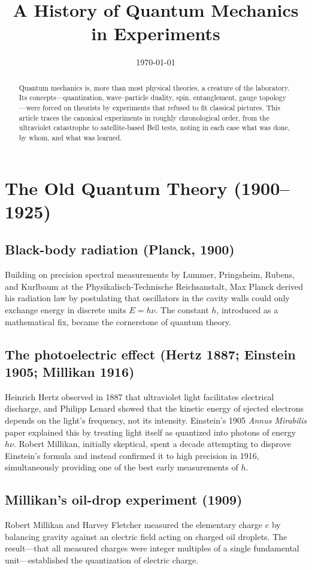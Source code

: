 \documentclass[11pt]{article}
\title{A History of Quantum Mechanics in Experiments}
\author{}
\date{\today}
\begin{document}
\maketitle

\begin{abstract}
Quantum mechanics is, more than most physical theories, a creature of the laboratory. Its concepts---quantization, wave--particle duality, spin, entanglement, gauge topology---were forced on theorists by experiments that refused to fit classical pictures. This article traces the canonical experiments in roughly chronological order, from the ultraviolet catastrophe to satellite-based Bell tests, noting in each case what was done, by whom, and what was learned.
\end{abstract}

\section{The Old Quantum Theory (1900--1925)}

\subsection{Black-body radiation (Planck, 1900)}
Building on precision spectral measurements by Lummer, Pringsheim, Rubens, and Kurlbaum at the Physikalisch-Technische Reichsanstalt, Max Planck derived his radiation law by postulating that oscillators in the cavity walls could only exchange energy in discrete units $E = h\nu$. The constant $h$, introduced as a mathematical fix, became the cornerstone of quantum theory.

\subsection{The photoelectric effect (Hertz 1887; Einstein 1905; Millikan 1916)}
Heinrich Hertz observed in 1887 that ultraviolet light facilitates electrical discharge, and Philipp Lenard showed that the kinetic energy of ejected electrons depends on the light's frequency, not its intensity. Einstein's 1905 \emph{Annus Mirabilis} paper explained this by treating light itself as quantized into photons of energy $h\nu$. Robert Millikan, initially skeptical, spent a decade attempting to disprove Einstein's formula and instead confirmed it to high precision in 1916, simultaneously providing one of the best early measurements of $h$.

\subsection{Millikan's oil-drop experiment (1909)}
Robert Millikan and Harvey Fletcher measured the elementary charge $e$ by balancing gravity against an electric field acting on charged oil droplets. The result---that all measured charges were integer multiples of a single fundamental unit---established the quantization of electric charge.
\end{document}

